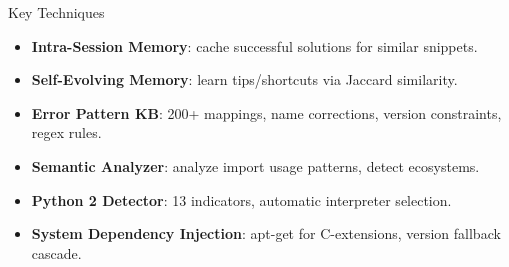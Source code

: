 \documentclass{beamer}
\begin{document}
\begin{frame}{Key Techniques}
  \begin{itemize}
    \item \textbf{Intra-Session Memory}: cache successful solutions for similar snippets.
    \item \textbf{Self-Evolving Memory}: learn tips/shortcuts via Jaccard similarity.
    \item \textbf{Error Pattern KB}: 200+ mappings, name corrections, version constraints, regex rules.
    \item \textbf{Semantic Analyzer}: analyze import usage patterns, detect ecosystems.
    \item \textbf{Python 2 Detector}: 13 indicators, automatic interpreter selection.
    \item \textbf{System Dependency Injection}: apt-get for C-extensions, version fallback cascade.
  \end{itemize}
\end{frame}
\end{document}
